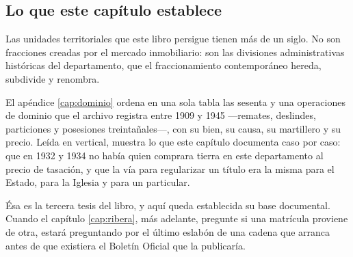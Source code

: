 \subsection*{Lo que este capítulo establece}

Las unidades territoriales que este libro persigue tienen más de un siglo. No son
fracciones creadas por el mercado inmobiliario: son las divisiones administrativas
históricas del departamento, que el fraccionamiento contemporáneo hereda, subdivide y
renombra.

El apéndice \ref{cap:dominio} ordena en una sola tabla las sesenta y una operaciones de dominio que el archivo registra entre 1909 y 1945 ---remates, deslindes, particiones y posesiones treintañales---, con su bien, su causa, su martillero y su precio. Leída en vertical, muestra lo que este capítulo documenta caso por caso: que en 1932 y 1934 no había quien comprara tierra en este departamento al precio de tasación, y que la vía para regularizar un título era la misma para el Estado, para la Iglesia y para un particular.

Ésa es la tercera tesis del libro, y aquí queda establecida su base documental. Cuando el
capítulo \ref{cap:ribera}, más adelante, pregunte si una matrícula proviene de otra, estará preguntando por el último
eslabón de una cadena que arranca antes de que existiera el Boletín Oficial que la
publicaría.

